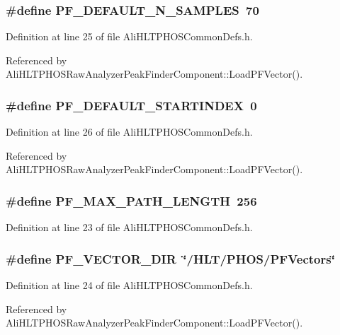 \subsubsection{\setlength{\rightskip}{0pt plus 5cm}\#define PF\_\-DEFAULT\_\-N\_\-SAMPLES\ 70}\label{AliHLTPHOSCommonDefs_8h_a15}




Definition at line 25 of file Ali\-HLTPHOSCommon\-Defs.h.

Referenced by Ali\-HLTPHOSRaw\-Analyzer\-Peak\-Finder\-Component::Load\-PFVector().
\subsubsection{\setlength{\rightskip}{0pt plus 5cm}\#define PF\_\-DEFAULT\_\-STARTINDEX\ 0}\label{AliHLTPHOSCommonDefs_8h_a16}




Definition at line 26 of file Ali\-HLTPHOSCommon\-Defs.h.

Referenced by Ali\-HLTPHOSRaw\-Analyzer\-Peak\-Finder\-Component::Load\-PFVector().
\subsubsection{\setlength{\rightskip}{0pt plus 5cm}\#define PF\_\-MAX\_\-PATH\_\-LENGTH\ 256}\label{AliHLTPHOSCommonDefs_8h_a13}




Definition at line 23 of file Ali\-HLTPHOSCommon\-Defs.h.
\subsubsection{\setlength{\rightskip}{0pt plus 5cm}\#define PF\_\-VECTOR\_\-DIR\ \char`\"{}/HLT/PHOS/PFVectors\char`\"{}}\label{AliHLTPHOSCommonDefs_8h_a14}




Definition at line 24 of file Ali\-HLTPHOSCommon\-Defs.h.

Referenced by Ali\-HLTPHOSRaw\-Analyzer\-Peak\-Finder\-Component::Load\-PFVector().